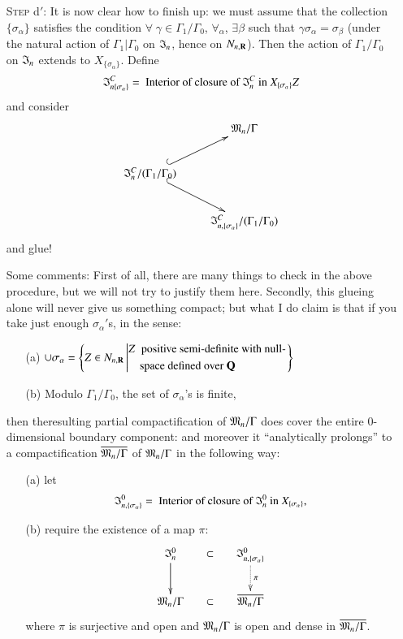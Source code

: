 \begin{itemize}
\item[\textsc{Step} d$'$:] It is now clear how to finish up: we must assume that the collection $\{\sigma_\alpha\}$ satisfies the condition $\forall \; \gamma \in \Gamma_1 / \Gamma_0$, $\forall_\alpha$, $\exists \beta$ such that $\gamma \sigma_\alpha = \sigma_\beta$ (under the natural action of $\Gamma_1 | \Gamma_0$ on $\mathfrak{I}_n$, hence on $N_{n,\mathbf{R}}$). Then the action of $\Gamma_1 / \Gamma_0$ on $\mathfrak{I}_n$ extends to $X_{\{\sigma_\alpha\}}$. Define
$$
\mathfrak{I}^C_{n \{\sigma_\alpha\}} = \text{ Interior of closure of } \mathfrak{I}^C_n \text{ in } X_{\{\sigma_{\alpha}\}} Z
$$
and consider
$$
\xymatrix{
& \fM_n/ \Gamma \\
\fI^C_n / (\Gamma_1 / \Gamma_0) \ar@{^{(}->}[ur]  \ar@{^{(}->}[dr] & \\
& \fI^C_{n, \{\sigma_\alpha\}} / (\Gamma_1/ \Gamma_0)
}
$$
and glue!

Some comments: First of all, there are many things to check in the above procedure, but we will not try to justify them here. Secondly, this glueing alone will never give us something compact;  but what I do claim is that if you take just enough $\sigma_\alpha'$s, in the sense:
\begin{itemize}
\item[(a)] $\cup \sigma_\alpha = \left\{ Z \in N_{n, \mathbf{R}} \left|
\begin{aligned}
& Z \; \text{ positive semi-definite with null-}\\
& \quad \text{space defined over } \mathbf{Q}
\end{aligned}
\right.
\right\}$

\item[(b)] Modulo $\Gamma_1/ \Gamma_0$, the set of $\sigma_\alpha$'s is finite,
\end{itemize}
then the\pageoriginale resulting partial compactification of $\mathfrak{M}_n/\Gamma$ does cover the entire 0-dimensional boundary component: and moreover it ``analytically prolongs'' to a compactification $\overline{\mathfrak{M}_n/ \Gamma}$ of $\mathfrak{M}_n/\Gamma$  in the following way:
\begin{itemize}
\item[(a)] let 
$$
\mathfrak{I}^0_{n, \{\sigma_\alpha\}} = \text{ Interior of closure of } \mathfrak{I}^0_n \text{ in } X_{\{\sigma_\alpha\}},
$$

\item[(b)] require the existence of a map $\pi$:
$$
\xymatrix@C=0.5cm{
\fI^0_n \ar[d] & \subset &  \fI^0_{n, \{\sigma_\alpha\}} \ar@{..>}[d]^-{\pi}\\
\fM_n/\Gamma & \subset & \overline{\fM_n/\Gamma}
}
$$
where $\pi$ is surjective and open and $\mathfrak{M}_n/\Gamma$ is open and dense in $\overline{\mathfrak{M}_n/\Gamma}$.


\end{itemize}
\end{itemize}
